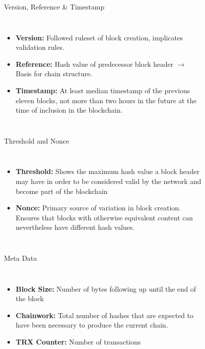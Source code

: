 \documentclass[]{beamer}
\begin{document}
\begin{frame}{Version, Reference \& Timestamp}
	\begin{columns}
		\begin{itemize}
			\item \textbf{Version:} Followed ruleset of block creation, implicates validation rules.
			\item \textbf{Reference:} Hash value of predecessor block header $\rightarrow$ Basis for chain structure.
			\item \textbf{Timestamp:} At least median timestamp of the previous eleven blocks, not more than two hours in the future at the time of inclusion in the blockchain. 
		\end{itemize}
		\begin{figure}
			
		\end{figure}
	\end{columns}
\end{frame}


\begin{frame}{Threshold and Nonce}
	\begin{columns}
	\column{0.7\textwidth}
		\begin{itemize}
			\item \textbf{Threshold:} Shows the maximum hash value a block header may have in order to be considered valid by the network and become part of the blockchain
			\item \textbf{Nonce:} Primary source of variation in block creation. Ensures that blocks with otherwise equivalent content can nevertheless have different hash values.
		\end{itemize}
	\column{0.3\textwidth}
		\begin{figure}
			
		\end{figure}
	\end{columns}
\end{frame}


\begin{frame}{Meta Data}
	\begin{columns}
	\column{0.5\textwidth}
		\begin{itemize}
			\item \textbf{Block Size:} Number of bytes following up until the end of the block
			\item \textbf{Chainwork:} Total number of hashes that are expected to have been necessary to produce the current chain.
			\item \textbf{TRX Counter:} Number of transactions
		\end{itemize}
	\column{0.5\textwidth}
		\begin{figure}
			\begin{tikzpicture}[domain=-8:8,scale=1.2, every node/.style={scale=1.2}]
  				
  			\end{tikzpicture}
			\end{figure}
	\end{columns}
\end{frame}
\end{document}
